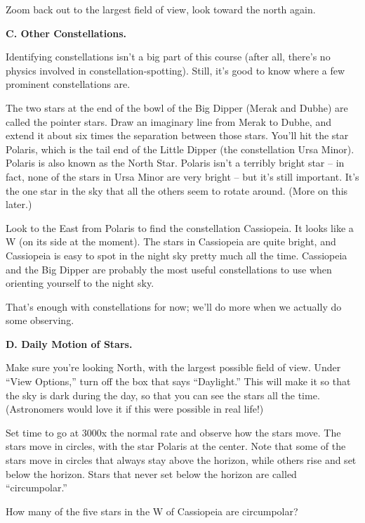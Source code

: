 Zoom back out to the largest field of view, look toward the north again.

\bigskip

{\bf C. Other Constellations.}

Identifying constellations isn't a big part of this course (after
all, there's no physics involved in constellation-spotting).  Still, it's
good to know where a few prominent constellations are.

The two stars at the end of the bowl of the Big Dipper (Merak and Dubhe)
are called the pointer stars.  Draw an imaginary line from Merak to Dubhe,
and extend it about six times the separation between those stars.
You'll hit the star Polaris, which is the tail end of the
Little Dipper (the constellation Ursa Minor).  Polaris is also known
as the North Star.  Polaris isn't a terribly bright star -- in fact,
none of the stars in Ursa Minor are very bright -- but it's still
important.  It's the one star in the sky that all the others seem
to rotate around.  (More on this later.)

Look to the East from Polaris to find the constellation Cassiopeia.  It
looks like a W (on its side at the moment).  The stars in Cassiopeia
are quite bright, and Cassiopeia is easy to spot in the night sky pretty
much all the time.  Cassiopeia and the Big Dipper are probably the most
useful constellations to use when orienting yourself to the night sky.

That's enough with constellations for now; we'll do more when we actually
do some observing.

\bigskip

{\bf D. Daily Motion of Stars.}

Make sure you're looking North, with the largest possible field
of view.  Under ``View Options,'' turn off the box that says ``Daylight.''
This will make it so that the sky is dark during the day, so that
you can see the stars all the time.  (Astronomers would love
it if this were possible in real life!)

Set time to go at 3000x the normal rate and observe how the stars move.
The stars move in circles, with the star Polaris at the center.
Note that some of the stars move in circles that always stay
above the horizon, while others rise and set below the horizon.
Stars that never set below the horizon are called ``circumpolar.''

How many of the five stars in the W of Cassiopeia are circumpolar?

\vskip 1in

